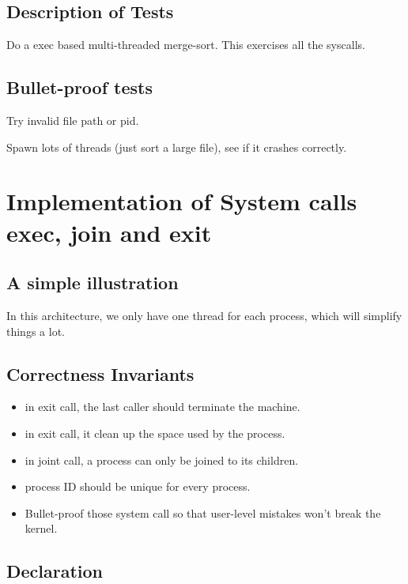 \documentclass{article}
\begin{document}
	\subsection{Description of Tests}
	Do a exec based multi-threaded merge-sort. This exercises all the syscalls.
	
	\subsection*{Bullet-proof tests}
	Try invalid file path or pid.
	
	Spawn lots of threads (just sort a large file), see if it crashes correctly.
	
	\section{Implementation of System calls exec, join and exit}
	\subsection{A simple illustration}
	In this architecture, we only have one thread for each process, which will simplify things a lot.
	\subsection{Correctness Invariants}
	\begin{itemize}
		\item in exit call, the last caller should terminate the machine.
		\item in exit call, it clean up the space used by the process.
		\item in joint call, a process can only be joined to its children.
		\item process ID should be unique for every process.
		\item Bullet-proof those system call so that user-level mistakes won't break the kernel.
	\end{itemize}
	\subsection{Declaration}
\end{document}
